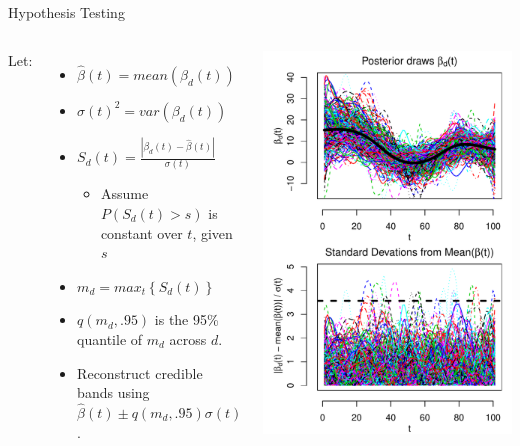 \documentclass[9 pt]{beamer}
\newcommand{\bi}{\begin{itemize}}
\newcommand{\ei}{\end{itemize}}
\newcommand{\ilist}[1]{\bi \item #1 \ei}
\begin{document}
\begin{frame}{Hypothesis Testing}

\begin{columns}[c]

Let:
\bi
\item $\hat{\beta}(t)=mean(\beta_d(t))$
\item $\sigma(t)^2 = var(\beta_d(t))$
\item $S_d(t) = \frac{|\beta_d(t)-\hat{\beta}(t)    | } {\sigma(t)}$
\ilist{Assume $P(S_d(t)>s)$ is constant over $t$, given $s$}
\item $m_d= max_t \left\lbrace S_d(t) \right\rbrace$
\item $q(m_d,.95)$ is the 95\% quantile of $m_d$ across $d$.
\item Reconstruct credible bands using $\hat{\beta}(t) \pm  q(m_d,.95)\sigma(t)$.
\ei


\includegraphics[scale=.4]{pics/Figure_Get_d_dist.pdf}
\end{columns} 

\end{frame}
\end{document}
